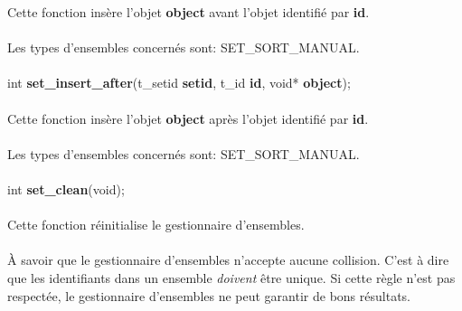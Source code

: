 \documentclass[10pt,a4wide]{article}
\begin{document}
Cette fonction ins\`ere l'objet \textbf{object} avant l'objet identifi\'e
par \textbf{id}.

\paragraph{}

Les types d'ensembles concern\'es sont: SET\_SORT\_MANUAL.

\paragraph{}

\hspace{1.5cm}int \textbf{set\_insert\_after}(t\_setid \textbf{setid},
                                              t\_id \textbf{id},
                                              void* \textbf{object});

\paragraph{}

Cette fonction ins\`ere l'objet \textbf{object} apr\`es l'objet identifi\'e
par \textbf{id}.

\paragraph{}

Les types d'ensembles concern\'es sont: SET\_SORT\_MANUAL.

\paragraph{}

\hspace{1.5cm}int \textbf{set\_clean}(void);

\paragraph{}

Cette fonction r\'einitialise le gestionnaire d'ensembles.

\paragraph{}

\`A savoir que le gestionnaire d'ensembles n'accepte aucune collision.
C'est \`a dire que les identifiants dans un ensemble \textit{doivent}
\^etre unique. Si cette r\`egle n'est pas respect\'ee, le gestionnaire
d'ensembles ne peut garantir de bons r\'esultats.
\end{document}
